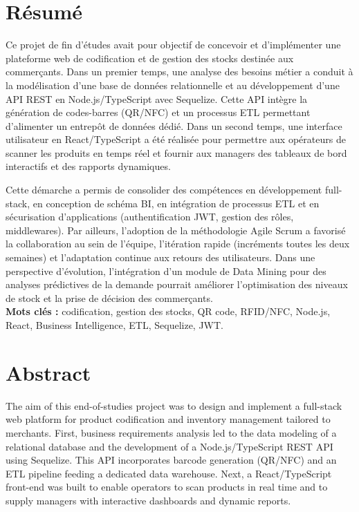 \documentclass[12pt,a4paper]{report}
\begin{document}
\cleardoublepage
\chapter*{Résumé}
{}
Ce projet de fin d’études avait pour objectif de concevoir et d’implémenter une plateforme web de codification et de gestion des stocks destinée aux commerçants. Dans un premier temps, une analyse des besoins métier a conduit à la modélisation d’une base de données relationnelle et au développement d’une API REST en Node.js/TypeScript avec Sequelize. Cette API intègre la génération de codes-barres (QR/NFC) et un processus ETL permettant d’alimenter un entrepôt de données dédié. Dans un second temps, une interface utilisateur en React/TypeScript a été réalisée pour permettre aux opérateurs de scanner les produits en temps réel et fournir aux managers des tableaux de bord interactifs et des rapports dynamiques.

Cette démarche a permis de consolider des compétences en développement full-stack, en conception de schéma BI, en intégration de processus ETL et en sécurisation d’applications (authentification JWT, gestion des rôles, middlewares). Par ailleurs, l’adoption de la méthodologie Agile Scrum a favorisé la collaboration au sein de l’équipe, l’itération rapide (incréments toutes les deux semaines) et l’adaptation continue aux retours des utilisateurs. Dans une perspective d’évolution, l’intégration d’un module de Data Mining pour des analyses prédictives de la demande pourrait améliorer l’optimisation des niveaux de stock et la prise de décision des commerçants.\\
\textbf{Mots clés :} codification, gestion des stocks, QR code, RFID/NFC, Node.js, React, Business Intelligence, ETL, Sequelize, JWT.

\cleardoublepage
{}
\chapter*{Abstract}
The aim of this end-of-studies project was to design and implement a full-stack web platform for product codification and inventory management tailored to merchants. First, business requirements analysis led to the data modeling of a relational database and the development of a Node.js/TypeScript REST API using Sequelize. This API incorporates barcode generation (QR/NFC) and an ETL pipeline feeding a dedicated data warehouse. Next, a React/TypeScript front-end was built to enable operators to scan products in real time and to supply managers with interactive dashboards and dynamic reports.
\end{document}

